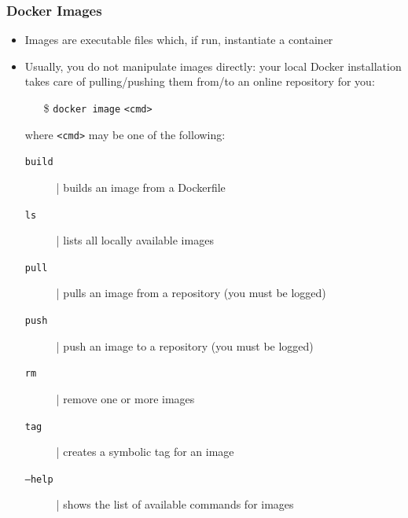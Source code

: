 \documentclass[presentation]{beamer}\mode<presentation>{\usetheme{AMSBolognaFC}}
\begin{document}
\begin{frame}
\frametitle[Docker Images]{Docker Images}

\begin{itemize}
	\item Images are executable files which, if run, instantiate a container
	\item Usually, you do not manipulate images directly: your local Docker installation takes care of pulling/pushing them from/to an online \alert{repository} for you:
	\begin{itemize}
		\item[\$] \texttt{docker image} \texttt{\alert{<cmd>}}
	\end{itemize}
	where \texttt{<cmd>} may be one of the following:
	\begin{description}
		\item[\texttt{build}] | builds an image from a \alert{Dockerfile}
		\item[\texttt{ls}] | lists all locally available images
		\item[\texttt{pull}] | pulls an image from a \alert{repository} (you must be logged)
		\item[\texttt{push}] | push an image to a \alert{repository} (you must be logged)
		\item[\texttt{rm}] | remove one or more images
		\item[\texttt{tag}] | creates a symbolic tag for an image
		\item[\texttt{--help}] | shows the list of available commands for images

	\end{description}

\end{itemize}

\end{frame}
\end{document}
